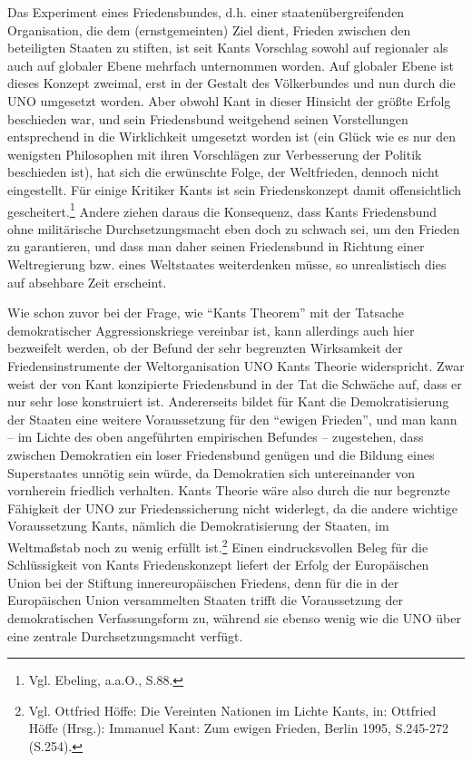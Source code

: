 \documentclass[12pt,a4paper,ngerman]{article}
\begin{document}
Das Experiment eines Friedensbundes, d.h. einer staatenübergreifenden
Organisation, die dem (ernstgemeinten) Ziel dient, Frieden zwischen
den beteiligten Staaten zu stiften, ist seit Kants Vorschlag sowohl
auf regionaler als auch auf globaler Ebene mehrfach unternommen
worden. Auf globaler Ebene ist dieses Konzept zweimal, erst in der
Gestalt des Völkerbundes und nun durch die UNO umgesetzt worden.
Aber obwohl Kant in dieser Hinsicht der größte Erfolg beschieden war,
und sein Friedensbund weitgehend seinen Vorstellungen entsprechend in
die Wirklichkeit umgesetzt worden ist (ein Glück wie es nur den
wenigsten Philosophen mit ihren Vorschlägen zur Verbesserung der
Politik beschieden ist), hat sich die erwünschte Folge, der
Weltfrieden, dennoch nicht eingestellt. Für einige Kritiker Kants ist
sein Friedenskonzept damit offensichtlich gescheitert.\footnote{Vgl.
  Ebeling, a.a.O., S.88.} Andere ziehen daraus die Konsequenz, dass
Kants Friedensbund ohne militärische Durchsetzungsmacht eben doch zu
schwach sei, um den Frieden zu garantieren, und dass man daher seinen
Friedensbund in Richtung einer Weltregierung bzw. eines Weltstaates
weiterdenken müsse, so unrealistisch dies auf absehbare Zeit
erscheint.

Wie schon zuvor bei der Frage, wie "`Kants Theorem"' mit der Tatsache
demokratischer Aggressionskriege vereinbar ist, kann allerdings auch
hier bezweifelt werden, ob der Befund der sehr begrenzten Wirksamkeit
der Friedensinstrumente der Weltorganisation UNO Kants Theorie
widerspricht. Zwar weist der von Kant konzipierte Friedensbund in der
Tat die Schwäche auf, dass er nur sehr lose konstruiert ist.
Andererseits bildet für Kant die Demokratisierung der Staaten eine
weitere Voraussetzung für den "`ewigen Frieden"', und man kann -- im
Lichte des oben angeführten empirischen Befundes -- zugestehen, dass
zwischen Demokratien ein loser Friedensbund genügen und die Bildung
eines Superstaates unnötig sein würde, da Demokratien sich
untereinander von vornherein friedlich verhalten. Kants Theorie wäre
also durch die nur begrenzte Fähigkeit der UNO zur Friedenssicherung
nicht widerlegt, da die andere wichtige Voraussetzung Kants, nämlich
die Demokratisierung der Staaten, im Weltmaßstab noch zu wenig erfüllt
ist.\footnote{Vgl. Ottfried Höffe: Die Vereinten Nationen im Lichte
  Kants, in: Ottfried Höffe (Hrsg.): Immanuel Kant: Zum ewigen
  Frieden, Berlin 1995, S.245-272 (S.254).} Einen
eindrucksvollen Beleg für die Schlüssigkeit von Kants Friedenskonzept
liefert der Erfolg der Europäischen Union bei der Stiftung
innereuropäischen Friedens, denn für die in der Europäischen Union
versammelten Staaten trifft die Voraussetzung der demokratischen
Verfassungsform zu, während sie ebenso wenig wie die UNO über eine
zentrale Durchsetzungsmacht verfügt.
\end{document}
